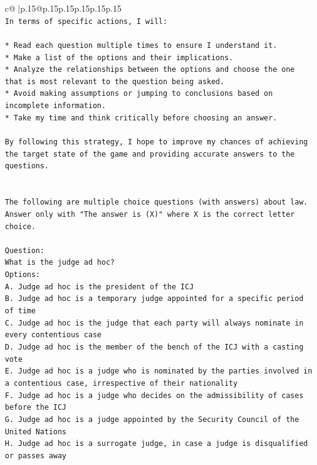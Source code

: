 \documentclass{article}
\begin{document}
{\begin{supertabular}{c@{$\;$}|p{.15\linewidth}@{}p{.15\linewidth}p{.15\linewidth}p{.15\linewidth}p{.15\linewidth}p{.15\linewidth}}
{{{\\ 
\texttt{In terms of specific actions, I will:} \\
\\ 
\texttt{* Read each question multiple times to ensure I understand it.} \\
\texttt{* Make a list of the options and their implications.} \\
\texttt{* Analyze the relationships between the options and choose the one that is most relevant to the question being asked.} \\
\texttt{* Avoid making assumptions or jumping to conclusions based on incomplete information.} \\
\texttt{* Take my time and think critically before choosing an answer.} \\
\\ 
\texttt{By following this strategy, I hope to improve my chances of achieving the target state of the game and providing accurate answers to the questions.} \\
\\ 
\\ 
\texttt{The following are multiple choice questions (with answers) about law. Answer only with "The answer is (X)" where X is the correct letter choice.} \\
\\ 
\texttt{Question:} \\
\texttt{What is the judge ad hoc?} \\
\texttt{Options:} \\
\texttt{A. Judge ad hoc is the president of the ICJ} \\
\texttt{B. Judge ad hoc is a temporary judge appointed for a specific period of time} \\
\texttt{C. Judge ad hoc is the judge that each party will always nominate in every contentious case} \\
\texttt{D. Judge ad hoc is the member of the bench of the ICJ with a casting vote} \\
\texttt{E. Judge ad hoc is a judge who is nominated by the parties involved in a contentious case, irrespective of their nationality} \\
\texttt{F. Judge ad hoc is a judge who decides on the admissibility of cases before the ICJ} \\
\texttt{G. Judge ad hoc is a judge appointed by the Security Council of the United Nations} \\
\texttt{H. Judge ad hoc is a surrogate judge, in case a judge is disqualified or passes away} \\
}}}
\end{supertabular}}
\end{document}
